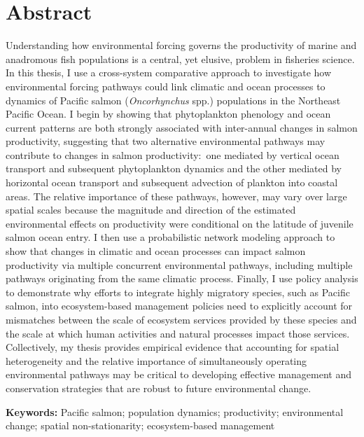 %
%
%


\chapter*{Abstract}


Understanding how environmental forcing governs the productivity of marine and
anadromous fish populations is a central, yet elusive, problem in fisheries
science. In this thesis, I use a cross-system comparative approach to
investigate how environmental forcing pathways could link climatic and ocean
processes to dynamics of Pacific salmon (\textit{Oncorhynchus} spp.) populations
in the Northeast Pacific Ocean. I begin by showing that phytoplankton phenology
and ocean current patterns are both strongly associated with inter-annual
changes in salmon productivity, suggesting that two alternative environmental
pathways may contribute to changes in salmon productivity:~one mediated by
vertical ocean transport and subsequent phytoplankton dynamics and the other
mediated by horizontal ocean transport and subsequent advection of plankton into
coastal areas. The relative importance of these pathways, however, may vary over
large spatial scales because the magnitude and direction of the estimated
environmental effects on productivity were conditional on the latitude of
juvenile salmon ocean entry. I then use a probabilistic network modeling
approach to show that changes in climatic and ocean processes can impact salmon
productivity via multiple concurrent environmental pathways, including multiple
pathways originating from the same climatic process. Finally, I use policy
analysis to demonstrate why efforts to integrate highly migratory species, such
as Pacific salmon, into ecosystem-based management policies need to explicitly
account for mismatches between the scale of ecosystem services provided by these
species and the scale at which human activities and natural processes impact
those services. Collectively, my thesis provides empirical evidence that
accounting for spatial heterogeneity and the relative importance of
simultaneously operating environmental pathways may be critical to developing
effective management and conservation strategies that are robust to future
environmental change.
\newline

\noindent \textbf{Keywords:} Pacific salmon; population dynamics; productivity;
environmental change; spatial non-stationarity; ecosystem-based management

